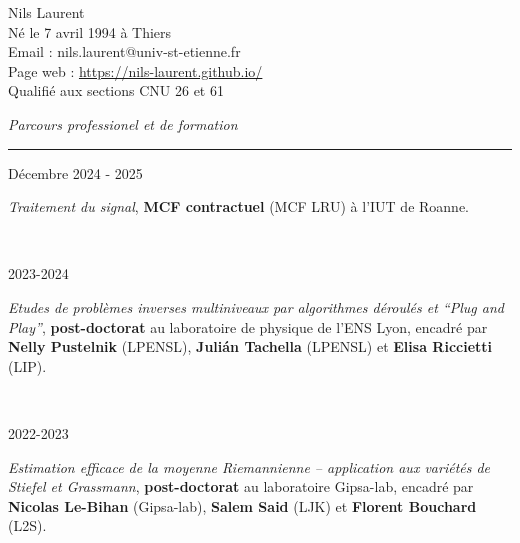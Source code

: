 
{\color{DefaultGray}
	\noindent
	Nils Laurent\\
	Né le 7 avril 1994 à Thiers\\
	Email : nils.laurent@univ-st-etienne.fr\\
	Page web : \url{https://nils-laurent.github.io/}\\
	Qualifié aux sections CNU 26 et 61\\
	\vspace{5mm}
	
	\noindent
	\textit{\Large \color{MyGray} \hspace{5mm} Parcours professionel et de formation}
	\vspace{2mm}
	{\color{DefaultGray}\hrule height .1pt}
	\vspace{4mm}
	
	\noindent
	\begin{minipage}{0.20\textwidth}
		\color{MyGray} Décembre 2024 - 2025
	\end{minipage}
	\hfill
	\begin{minipage}{0.70\textwidth}
		\emph{Traitement du signal}, \textbf{MCF contractuel} (MCF LRU) à l'IUT de Roanne.
	\end{minipage}\\
	\vspace{2mm}
	
	\noindent
	\begin{minipage}{0.20\textwidth}
		\color{MyGray} 2023-2024
	\end{minipage}
	\hfill
	\begin{minipage}{0.70\textwidth}
		\emph{Etudes de problèmes inverses multiniveaux par algorithmes déroulés et ``Plug and Play''}, \textbf{post-doctorat} au laboratoire de physique de l'ENS Lyon, encadré par \textbf{Nelly Pustelnik} (LPENSL), \textbf{Julián Tachella} (LPENSL) et \textbf{Elisa Riccietti} (LIP).
	\end{minipage}\\
	\vspace{2mm}
	
	\noindent
	\begin{minipage}{0.20\textwidth}
		\color{MyGray} 2022-2023
	\end{minipage}
	\hfill
	\begin{minipage}{0.70\textwidth}
		\emph{Estimation efficace de la moyenne Riemannienne -- application aux variétés de Stiefel et Grassmann}, \textbf{post-doctorat} au laboratoire Gipsa-lab, encadré par \textbf{Nicolas Le-Bihan} (Gipsa-lab), \textbf{Salem Said} (LJK) et \textbf{Florent Bouchard} (L2S).
	\end{minipage}\\
	\vspace{2mm}
	
}
